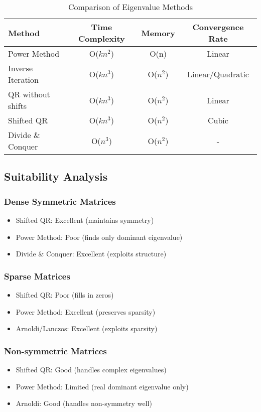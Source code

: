 \documentclass{article}
\begin{document}
\begin{table}[H]
\centering
\caption{Comparison of Eigenvalue Methods}
\begin{tabular}{@{}lccc@{}}
\toprule
Method & Time Complexity & Memory & Convergence Rate \\
\midrule
Power Method & O($kn^2$) & O(n) & Linear \\
	Inverse Iteration & O($kn^3$) & O($n^2$) & Linear/Quadratic \\
QR without shifts & O($kn^3$) & O($n^2$) & Linear \\
Shifted QR & O($kn^3$) & O($n^2$) & Cubic \\
Divide \& Conquer & O($n^3$) & O($n^2$) & - \\
\bottomrule
\end{tabular}
\end{table}

\subsection{Suitability Analysis}

\subsubsection{Dense Symmetric Matrices}
\begin{itemize}
    \item Shifted QR: Excellent (maintains symmetry)
    \item Power Method: Poor (finds only dominant eigenvalue)
    \item Divide \& Conquer: Excellent (exploits structure)
\end{itemize}

\subsubsection{Sparse Matrices}
\begin{itemize}
    \item Shifted QR: Poor (fills in zeros)
    \item Power Method: Excellent (preserves sparsity)
    \item Arnoldi/Lanczos: Excellent (exploits sparsity)
\end{itemize}

\subsubsection{Non-symmetric Matrices}
\begin{itemize}
    \item Shifted QR: Good (handles complex eigenvalues)
    \item Power Method: Limited (real dominant eigenvalue only)
    \item Arnoldi: Good (handles non-symmetry well)
\end{itemize}
\end{document}
